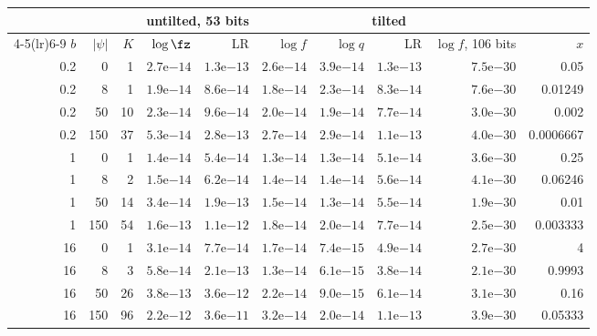 \begin{tabular}{rrrrrrrrrr}\toprule
& & & \multicolumn{2}{c}{untilted, 53 bits} & \multicolumn{4}{c}{tilted} & \\\cmidrule(lr){4-5}\cmidrule(lr){6-9}
$b$ & $|\psi|$ & $K$ & $\log\fz$ & LR & $\log f$ & $\log q$ & LR & $\log f$, 106 bits & $x$\\\midrule
0.2 & 0 & 1 & $2.7\mathrm{e}{-14}$ & $1.3\mathrm{e}{-13}$ & $2.6\mathrm{e}{-14}$ & $3.9\mathrm{e}{-14}$ & $1.3\mathrm{e}{-13}$ & $7.5\mathrm{e}{-30}$ & 0.05\\
0.2 & 8 & 1 & $1.9\mathrm{e}{-14}$ & $8.6\mathrm{e}{-14}$ & $1.8\mathrm{e}{-14}$ & $2.3\mathrm{e}{-14}$ & $8.3\mathrm{e}{-14}$ & $7.6\mathrm{e}{-30}$ & 0.01249\\
0.2 & 50 & 10 & $2.3\mathrm{e}{-14}$ & $9.6\mathrm{e}{-14}$ & $2.0\mathrm{e}{-14}$ & $1.9\mathrm{e}{-14}$ & $7.7\mathrm{e}{-14}$ & $3.0\mathrm{e}{-30}$ & 0.002\\
0.2 & 150 & 37 & $5.3\mathrm{e}{-14}$ & $2.8\mathrm{e}{-13}$ & $2.7\mathrm{e}{-14}$ & $2.9\mathrm{e}{-14}$ & $1.1\mathrm{e}{-13}$ & $4.0\mathrm{e}{-30}$ & 0.0006667\\
1 & 0 & 1 & $1.4\mathrm{e}{-14}$ & $5.4\mathrm{e}{-14}$ & $1.3\mathrm{e}{-14}$ & $1.3\mathrm{e}{-14}$ & $5.1\mathrm{e}{-14}$ & $3.6\mathrm{e}{-30}$ & 0.25\\
1 & 8 & 2 & $1.5\mathrm{e}{-14}$ & $6.2\mathrm{e}{-14}$ & $1.4\mathrm{e}{-14}$ & $1.4\mathrm{e}{-14}$ & $5.6\mathrm{e}{-14}$ & $4.1\mathrm{e}{-30}$ & 0.06246\\
1 & 50 & 14 & $3.4\mathrm{e}{-14}$ & $1.9\mathrm{e}{-13}$ & $1.5\mathrm{e}{-14}$ & $1.3\mathrm{e}{-14}$ & $5.5\mathrm{e}{-14}$ & $1.9\mathrm{e}{-30}$ & 0.01\\
1 & 150 & 54 & $1.6\mathrm{e}{-13}$ & $1.1\mathrm{e}{-12}$ & $1.8\mathrm{e}{-14}$ & $2.0\mathrm{e}{-14}$ & $7.7\mathrm{e}{-14}$ & $2.5\mathrm{e}{-30}$ & 0.003333\\
16 & 0 & 1 & $3.1\mathrm{e}{-14}$ & $7.7\mathrm{e}{-14}$ & $1.7\mathrm{e}{-14}$ & $7.4\mathrm{e}{-15}$ & $4.9\mathrm{e}{-14}$ & $2.7\mathrm{e}{-30}$ & 4\\
16 & 8 & 3 & $5.8\mathrm{e}{-14}$ & $2.1\mathrm{e}{-13}$ & $1.3\mathrm{e}{-14}$ & $6.1\mathrm{e}{-15}$ & $3.8\mathrm{e}{-14}$ & $2.1\mathrm{e}{-30}$ & 0.9993\\
16 & 50 & 26 & $3.8\mathrm{e}{-13}$ & $3.6\mathrm{e}{-12}$ & $2.2\mathrm{e}{-14}$ & $9.0\mathrm{e}{-15}$ & $6.1\mathrm{e}{-14}$ & $3.1\mathrm{e}{-30}$ & 0.16\\
16 & 150 & 96 & $2.2\mathrm{e}{-12}$ & $3.6\mathrm{e}{-11}$ & $3.2\mathrm{e}{-14}$ & $2.0\mathrm{e}{-14}$ & $1.1\mathrm{e}{-13}$ & $3.9\mathrm{e}{-30}$ & 0.05333\\

\end{tabular}
